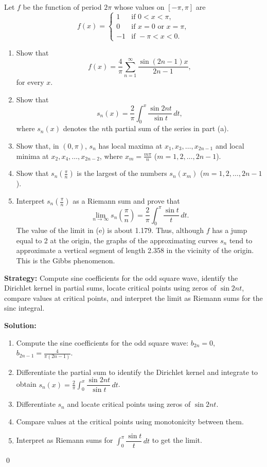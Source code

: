\begin{problembox}
\begin{problemstatement}
Let $f$ be the function of period $2\pi$ whose values on $[-\pi, \pi]$ are
\[
f(x) = 
\begin{cases} 
1 & \text{if } 0 < x < \pi, \\
0 & \text{if } x = 0 \text{ or } x = \pi, \\
-1 & \text{if } -\pi < x < 0.
\end{cases}
\]
\begin{enumerate}[label=(\alph*)]
\item Show that
\[
f(x) = \frac{4}{\pi} \sum_{n=1}^\infty \frac{\sin (2n - 1)x}{2n - 1},
\]
for every $x$.
\item Show that
\[
s_n(x) = \frac{2}{\pi} \int_0^x \frac{\sin 2nt}{\sin t} \, dt,
\]
where $s_n(x)$ denotes the $n$th partial sum of the series in part (a).
\item Show that, in $(0, \pi)$, $s_n$ has local maxima at $x_1, x_3, \dots, x_{2n-1}$ and local minima at $x_2, x_4, \dots, x_{2n-2}$, where $x_m = \frac{m\pi}{n}$ ($m = 1, 2, \dots, 2n - 1$).
\item Show that $s_n\left(\frac{\pi}{n}\right)$ is the largest of the numbers $s_n(x_m)$ ($m = 1, 2, \dots, 2n - 1$).
\item Interpret $s_n\left(\frac{\pi}{n}\right)$ as a Riemann sum and prove that
\[
\lim_{n \to \infty} s_n\left(\frac{\pi}{n}\right) = \frac{2}{\pi} \int_0^\pi \frac{\sin t}{t} \, dt.
\]
The value of the limit in (e) is about 1.179. Thus, although $f$ has a jump equal to 2 at the origin, the graphs of the approximating curves $s_n$ tend to approximate a vertical segment of length 2.358 in the vicinity of the origin. This is the Gibbs phenomenon.
\end{enumerate}
\end{problemstatement}
\end{problembox}

\noindent\textbf{Strategy:} Compute sine coefficients for the odd square wave, identify the Dirichlet kernel in partial sums, locate critical points using zeros of $\sin 2nt$, compare values at critical points, and interpret the limit as Riemann sums for the sinc integral.

\bigskip\noindent\textbf{Solution:}
\begin{enumerate}[label=(\alph*)]
\item Compute the sine coefficients for the odd square wave: $b_{2n}=0$, $b_{2n-1}=\tfrac{4}{\pi(2n-1)}$.
\item Differentiate the partial sum to identify the Dirichlet kernel and integrate to obtain $s_n(x)=\tfrac{2}{\pi}\int_0^x \dfrac{\sin 2nt}{\sin t}\,dt$.
\item Differentiate $s_n$ and locate critical points using zeros of $\sin 2nt$.
\item Compare values at the critical points using monotonicity between them.
\item Interpret as Riemann sums for $\int_0^{\pi} \dfrac{\sin t}{t}\,dt$ to get the limit.
\end{enumerate}\qed


